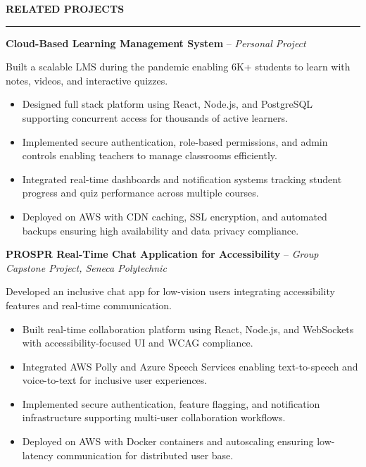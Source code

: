 \documentclass[10pt,letterpaper]{article}
\begin{document}
\vspace{6pt}

\textbf{RELATED PROJECTS}\\[-8pt]
\noindent\rule{\textwidth}{1pt}

\vspace{-2pt}

\textbf{Cloud-Based Learning Management System} -- \emph{Personal Project}

\vspace{-1pt}

Built a scalable LMS during the pandemic enabling 6K+ students to learn with notes, videos, and interactive quizzes.
\vspace{-1pt}
\begin{itemize}
\item Designed full stack platform using React, Node.js, and PostgreSQL supporting concurrent access for thousands of active learners.
\item Implemented secure authentication, role-based permissions, and admin controls enabling teachers to manage classrooms efficiently.
\item Integrated real-time dashboards and notification systems tracking student progress and quiz performance across multiple courses.
\item Deployed on AWS with CDN caching, SSL encryption, and automated backups ensuring high availability and data privacy compliance.
\end{itemize}

\textbf{PROSPR  Real-Time Chat Application for Accessibility} -- \emph{Group Capstone Project, Seneca Polytechnic}

\vspace{-1pt}

Developed an inclusive chat app for low-vision users integrating accessibility features and real-time communication.
\vspace{-1pt}
\begin{itemize}
\item Built real-time collaboration platform using React, Node.js, and WebSockets with accessibility-focused UI and WCAG compliance.
\item Integrated AWS Polly and Azure Speech Services enabling text-to-speech and voice-to-text for inclusive user experiences.
\item Implemented secure authentication, feature flagging, and notification infrastructure supporting multi-user collaboration workflows.
\item Deployed on AWS with Docker containers and autoscaling ensuring low-latency communication for distributed user base.
\end{itemize}
\end{document}
